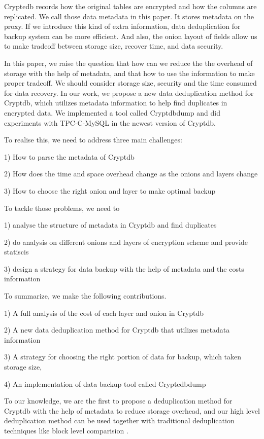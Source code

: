 Cryptedb records how the original tables are encrypted and how the columns are replicated. We call those data metadata in this paper. It stores metadata on the proxy. If we introduce this kind of extra information, data deduplication for backup system can be more efficient. And also, the onion layout of fields allow us to make tradeoff between storage size, recover time, and data security.


In this paper, we raise the question that how can we reduce the the overhead of storage with the help of metadata, and that how to use the information to make proper tradeoff. We should consider storage size, security and the time consumed for data recovery. In our work, we propose a new data deduplication method for Cryptdb, which utilizes metadata information to help find duplicates in encrypted data. We implemented a tool called Cryptdbdump and did experiments with TPC-C-MySQL in the newest version of Cryptdb.


To realise this, we need to address three main challenges:

1) How to parse the metadata of Cryptdb

2) How  does the time and space overhead change as the onions and layers change

3) How to choose the right onion and layer to make optimal backup


To tackle those problems, we need to

1) analyse the structure of metadata in Cryptdb and find duplicates

2) do analysis on different onions and layers of encryption scheme and provide statiscis

3) design a strategy for data backup with the help of metadata and the costs information 

To summarize, we make the following contributions.

1) A full analysis of the cost of each layer and onion in Cryptdb

2) A new data deduplication method for Cryptdb that utilizes metadata information 

3) A strategy for choosing the right portion of data for backup, which taken storage size, 

4) An implementation of data backup tool called Cryptedbdump 

To our knowledge, we are the first to propose a deduplication method for Cryptdb with the help of metadata to reduce storage overhead, and our high level deduplication method can be used together with traditional deduplication techniques like block level comparision \citep{bellare2013message}.

